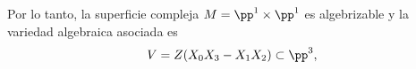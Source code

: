 \begin{example}
		Por lo tanto, la superficie compleja $M=\pp^1\times\pp^1$ es algebrizable y la variedad algebraica asociada es
		\begin{equation*}
			V=Z(X_0X_3-X_1X_2)\subset\pp^3,
		\end{equation*}
			
%			
%			

	\end{example}


